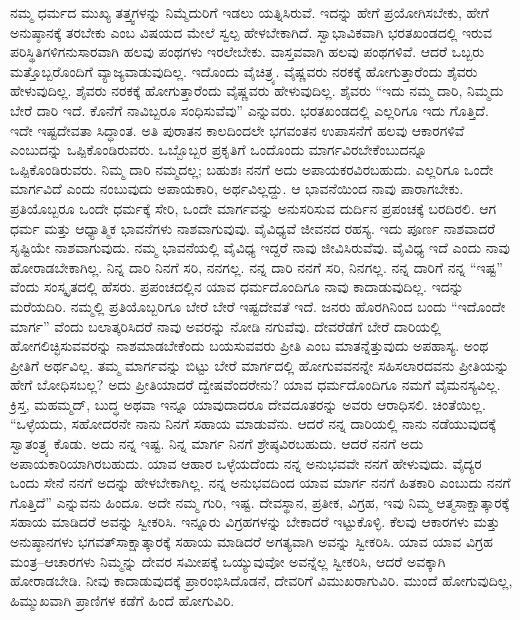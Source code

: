 ನಮ್ಮ ಧರ್ಮದ ಮುಖ್ಯ ತತ್ತ್ವಗಳನ್ನು ನಿಮ್ಮೆದುರಿಗೆ ಇಡಲು ಯತ್ನಿಸಿರುವೆ. ಇದನ್ನು ಹೇಗೆ ಪ್ರಯೋಗಿಸಬೇಕು, ಹೇಗೆ ಅನುಷ್ಠಾನಕ್ಕೆ ತರಬೇಕು ಎಂಬ ವಿಷಯದ ಮೇಲೆ ಸ್ವಲ್ಪ ಹೇಳಬೇಕಾಗಿದೆ. ಸ್ವಾಭಾವಿಕವಾಗಿ ಭರತಖಂಡದಲ್ಲಿ ಇರುವ ಪರಿಸ್ಥಿತಿಗಳಿಗನುಸಾರವಾಗಿ ಹಲವು ಪಂಥಗಳು ಇರಲೇಬೇಕು. ವಾಸ್ತವವಾಗಿ ಹಲವು ಪಂಥಗಳಿವೆ. ಆದರೆ ಒಬ್ಬರು ಮತ್ತೊಬ್ಬರೊಂದಿಗೆ ವ್ಯಾಜ್ಯವಾಡುವುದಿಲ್ಲ. ಇದೊಂದು ವೈಚಿತ್ರ್ಯ. ವೈಷ್ಣವರು ನರಕಕ್ಕೆ ಹೋಗುತ್ತಾರೆಂದು ಶೈವರು ಹೇಳುವುದಿಲ್ಲ. ಶೈವರು ನರಕಕ್ಕೆ ಹೋಗುತ್ತಾರೆಂದು ವೈಷ್ಣವರು ಹೇಳುವುದಿಲ್ಲ. ಶೈವರು “ಇದು ನಮ್ಮ ದಾರಿ, ನಿಮ್ಮದು ಬೇರೆ ದಾರಿ ಇದೆ. ಕೊನೆಗೆ ನಾವಿಬ್ಬರೂ ಸಂಧಿಸುವೆವು” ಎನ್ನುವರು. ಭರತಖಂಡದಲ್ಲಿ ಎಲ್ಲರಿಗೂ ಇದು ಗೊತ್ತಿದೆ. ಇದೇ ಇಷ್ಟದೇವತಾ ಸಿದ್ಧಾಂತ. ಅತಿ ಪುರಾತನ ಕಾಲದಿಂದಲೇ ಭಗವಂತನ ಉಪಾಸನೆಗೆ ಹಲವು ಆಕಾರಗಳಿವೆ ಎಂಬುದನ್ನು ಒಪ್ಪಿಕೊಂಡಿರುವರು. ಒಬ್ಬೊಬ್ಬರ ಪ್ರಕೃತಿಗೆ ಒಂದೊಂದು ಮಾರ್ಗವಿರಬೇಕೆಂಬುದನ್ನೂ ಒಪ್ಪಿಕೊಂಡಿರುವರು. ನಿಮ್ಮ ದಾರಿ ನಮ್ಮದಲ್ಲ; ಬಹುಶಃ ನನಗೆ ಅದು ಅಪಾಯಕರವಿರಬಹುದು. ಎಲ್ಲರಿಗೂ ಒಂದೇ ಮಾರ್ಗವಿದೆ ಎಂದು ನಂಬುವುದು ಅಪಾಯಕಾರಿ, ಅರ್ಥವಿಲ್ಲದ್ದು. ಆ ಭಾವನೆಯಿಂದ ನಾವು ಪಾರಾಗಬೇಕು. ಪ್ರತಿಯೊಬ್ಬರೂ ಒಂದೇ ಧರ್ಮಕ್ಕೆ ಸೇರಿ, ಒಂದೇ ಮಾರ್ಗವನ್ನು ಅನುಸರಿಸುವ ದುರ್ದಿನ ಪ್ರಪಂಚಕ್ಕೆ ಬರದಿರಲಿ. ಆಗ ಧರ್ಮ ಮತ್ತು ಆಧ್ಯಾತ್ಮಿಕ ಭಾವನೆಗಳು ನಾಶವಾಗುವುವು. ವೈವಿಧ್ಯವೆ ಜೀವನದ ರಹಸ್ಯ. ಇದು ಪೂರ್ಣ ನಾಶವಾದರೆ ಸೃಷ್ಟಿಯೇ ನಾಶವಾಗುವುದು. ನಮ್ಮ ಭಾವನೆಯಲ್ಲಿ ವೈವಿಧ್ಯ ಇದ್ದರೆ ನಾವು ಜೀವಿಸಿರುವೆವು. ವೈವಿಧ್ಯ ಇದೆ ಎಂದು ನಾವು ಹೋರಾಡಬೇಕಾಗಿಲ್ಲ. ನಿನ್ನ ದಾರಿ ನಿನಗೆ ಸರಿ, ನನಗಲ್ಲ. ನನ್ನ ದಾರಿ ನನಗೆ ಸರಿ, ನಿನಗಲ್ಲ. ನನ್ನ ದಾರಿಗೆ ನನ್ನ “ಇಷ್ಟ” ವೆಂದು ಸಂಸ್ಕೃತದಲ್ಲಿ ಹೆಸರು. ಪ್ರಪಂಚದಲ್ಲಿನ ಯಾವ ಧರ್ಮದೊಂದಿಗೂ ನಾವು ಕಾದಾಡುವುದಿಲ್ಲ. ಇದನ್ನು ಮರೆಯದಿರಿ. ನಮ್ಮಲ್ಲಿ ಪ್ರತಿಯೊಬ್ಬರಿಗೂ ಬೇರೆ ಬೇರೆ ಇಷ್ಟದೇವತೆ ಇದೆ. ಜನರು ಹೊರಗಿನಿಂದ ಬಂದು “ಇದೊಂದೇ ಮಾರ್ಗ” ವೆಂದು ಬಲಾತ್ಕರಿಸಿದರೆ ನಾವು ಅವರನ್ನು ನೋಡಿ ನಗುವೆವು. ದೇವರೆಡೆಗೆ ಬೇರೆ ದಾರಿಯಲ್ಲಿ ಹೋಗಲಿಚ್ಛಿಸುವವರನ್ನು ನಾಶಮಾಡಬೇಕೆಂದು ಬಯಸುವವರು ಪ್ರೀತಿ ಎಂಬ ಮಾತನ್ನೆತ್ತುವುದು ಅಪಹಾಸ್ಯ. ಅಂಥ ಪ್ರೀತಿಗೆ ಅರ್ಥವಿಲ್ಲ. ತಮ್ಮ ಮಾರ್ಗವನ್ನು ಬಿಟ್ಟು ಬೇರೆ ಮಾರ್ಗದಲ್ಲಿ ಹೋಗುವವನನ್ನೇ ಸಹಿಸಲಾರದವನು ಪ್ರೀತಿಯನ್ನು ಹೇಗೆ ಬೋಧಿಸಬಲ್ಲ? ಅದು ಪ್ರೀತಿಯಾದರೆ ದ್ವೇಷವೆಂದರೇನು? ಯಾವ ಧರ್ಮದೊಂದಿಗೂ ನಮಗೆ ವೈಮನಸ್ಯವಿಲ್ಲ. ಕ್ರಿಸ್ತ, ಮಹಮ್ಮದ್​, ಬುದ್ಧ ಅಥವಾ ಇನ್ನೂ ಯಾವುದಾದರೂ ದೇವದೂತರನ್ನು ಅವರು ಆರಾಧಿಸಲಿ. ಚಿಂತೆಯಿಲ್ಲ. “ಒಳ್ಳೆಯದು, ಸಹೋದರನೇ ನಾನು ನಿನಗೆ ಸಹಾಯ ಮಾಡುವೆನು. ಆದರೆ ನನ್ನ ದಾರಿಯಲ್ಲಿ ನಾನು ನಡೆಯುವುದಕ್ಕೆ ಸ್ವಾತಂತ್ರ್ಯ ಕೊಡು. ಅದು ನನ್ನ ಇಷ್ಟ. ನಿನ್ನ ಮಾರ್ಗ ನಿನಗೆ ಶ್ರೇಷ್ಠವಿರಬಹುದು. ಆದರೆ ನನಗೆ ಅದು ಅಪಾಯಕಾರಿಯಾಗಿರಬಹುದು. ಯಾವ ಆಹಾರ ಒಳ್ಳೆಯದೆಂದು ನನ್ನ ಅನುಭವವೇ ನನಗೆ ಹೇಳುವುದು. ವೈದ್ಯರ ಒಂದು ಸೇನೆ ನನಗೆ ಅದನ್ನು ಹೇಳಬೇಕಾಗಿಲ್ಲ. ನನ್ನ ಅನುಭವದಿಂದ ಯಾವ ಮಾರ್ಗ ನನಗೆ ಹಿತಕಾರಿ ಎಂಬುದು ನನಗೆ ಗೊತ್ತಿದೆ” ಎನ್ನುವನು ಹಿಂದೂ. ಅದೇ ನಮ್ಮ ಗುರಿ, ಇಷ್ಟ. ದೇವಸ್ಥಾನ, ಪ್ರತೀಕ, ವಿಗ್ರಹ, ಇವು ನಿಮ್ಮ ಆತ್ಮಸಾಕ್ಷಾತ್ಕಾರಕ್ಕೆ ಸಹಾಯ ಮಾಡಿದರೆ ಅವನ್ನು ಸ್ವೀಕರಿಸಿ. ಇನ್ನೂರು ವಿಗ್ರಹಗಳನ್ನು ಬೇಕಾದರೆ ಇಟ್ಟುಕೊಳ್ಳಿ. ಕೆಲವು ಆಕಾರಗಳು ಮತ್ತು ಅನುಷ್ಠಾನಗಳು ಭಗವತ್​ ಸಾಕ್ಷಾತ್ಕಾರಕ್ಕೆ ಸಹಾಯ ಮಾಡಿದರೆ ಅಗತ್ಯವಾಗಿ ಅವನ್ನು ಸ್ವೀಕರಿಸಿ. ಯಾವ ಯಾವ ವಿಗ್ರಹ ಮಂತ್ರ–ಆಚಾರಗಳು ನಿಮ್ಮನ್ನು ದೇವರ ಸಮೀಪಕ್ಕೆ ಒಯ್ಯುವುವೋ ಅವನ್ನೆಲ್ಲ ಸ್ವೀಕರಿಸಿ, ಆದರೆ ಅವಕ್ಕಾಗಿ ಹೋರಾಡಬೇಡಿ. ನೀವು ಕಾದಾಡುವುದಕ್ಕೆ ಪ್ರಾರಂಭಿಸಿದೊಡನೆ, ದೇವರಿಗೆ ವಿಮುಖರಾಗುವಿರಿ. ಮುಂದೆ ಹೋಗುವುದಿಲ್ಲ, ಹಿಮ್ಮುಖವಾಗಿ ಪ್ರಾಣಿಗಳ ಕಡೆಗೆ ಹಿಂದೆ ಹೋಗುವಿರಿ.

